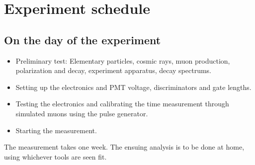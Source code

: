 \chapter*{Experiment schedule}

\section{On the day of the experiment}

\begin{itemize}

\item Preliminary test: Elementary particles, cosmic rays, muon production, polarization and decay, experiment apparatus, decay spectrums.

\item Setting up the electronics and PMT voltage, discriminators and gate lengths.

\item Testing the electronics and calibrating the time measurement through simulated muons using the pulse generator.

\item Starting the measurement.
\end{itemize}

The measurement takes one week. The ensuing analysis is to be done at home, using whichever tools are seen fit.


